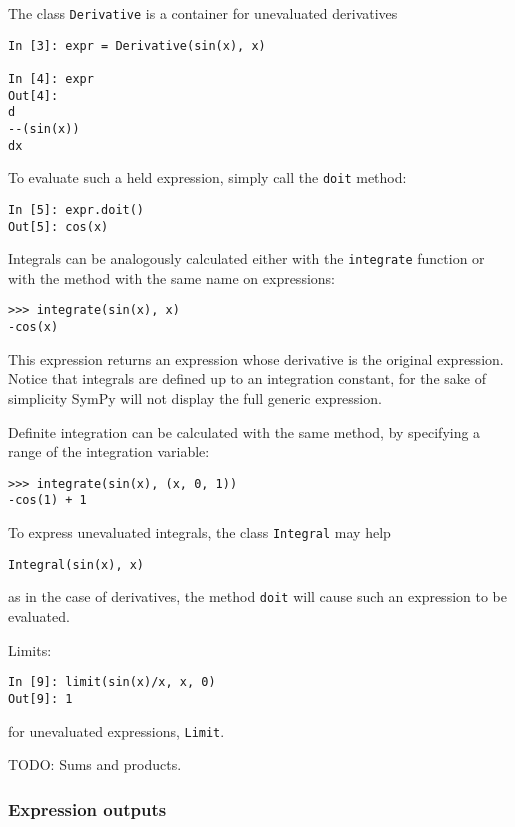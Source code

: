 The class \verb|Derivative| is a container for unevaluated derivatives

\begin{verbatim}
In [3]: expr = Derivative(sin(x), x)

In [4]: expr
Out[4]: 
d         
--(sin(x))
dx        
\end{verbatim}

To evaluate such a held expression, simply call the \verb|doit| method:

\begin{verbatim}
In [5]: expr.doit()
Out[5]: cos(x)
\end{verbatim}

Integrals can be analogously calculated either with the \verb|integrate| function
or with the method with the same name on expressions:
\begin{verbatim}
>>> integrate(sin(x), x)
-cos(x)
\end{verbatim}
This expression returns an expression whose derivative is the original expression.
Notice that integrals are defined up to an integration constant,
for the sake of simplicity SymPy will not display the full generic expression.

Definite integration can be calculated with the same method, by specifying a
range of the integration variable:
\begin{verbatim}
>>> integrate(sin(x), (x, 0, 1))
-cos(1) + 1
\end{verbatim}

To express unevaluated integrals, the class \verb|Integral| may help
\begin{verbatim}
Integral(sin(x), x)
\end{verbatim}
as in the case of derivatives, the method \verb|doit| will cause such an expression
to be evaluated.

Limits:
\begin{verbatim}
In [9]: limit(sin(x)/x, x, 0)
Out[9]: 1
\end{verbatim}
for unevaluated expressions, \verb|Limit|.

TODO: Sums and products.

\subsubsection{Expression outputs}


